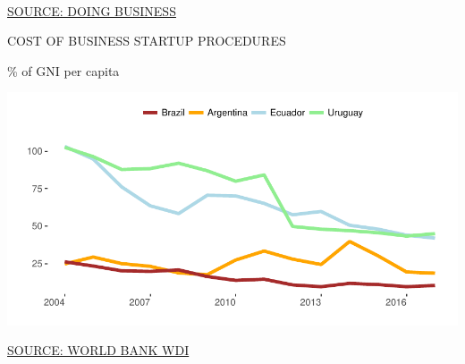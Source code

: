 \documentclass{article}\usepackage[]{graphicx}\usepackage[]{color}
\makeatletter
\def\maxwidth{ %
  \ifdim\Gin@nat@width>\linewidth
    \linewidth
  \else
    \Gin@nat@width
  \fi
}
\makeatother
\begin{document}
\begin{minipage}[b]{0.95\textwidth}
\begin{minipage}[c]{0.55\textwidth}
{      }
    \\[6pt]
     \scriptsize{\href{http://www.doingbusiness.org}{\textcolor[HTML]{22A6F5}{SOURCE: DOING BUSINESS}}}
  \end{minipage}
    \begin{minipage}[c]{0.40\textwidth} 
    \hspace{4ex}\small{\textcolor[HTML]{818181}{COST OF BUSINESS STARTUP PROCEDURES}}
    
    \hspace{4ex}\footnotesize{\textcolor[HTML]{818181}{\% of GNI per capita}}


\hfill{}\includegraphics[width=\maxwidth]{figure/line_chart_Policy-1} 



    \hspace{4ex}\scriptsize{\href{http://data.worldbank.org}{\textcolor[HTML]{22A6F5}{SOURCE: WORLD BANK WDI}}} 
  \end{minipage}
\end{minipage}

\end{document}
